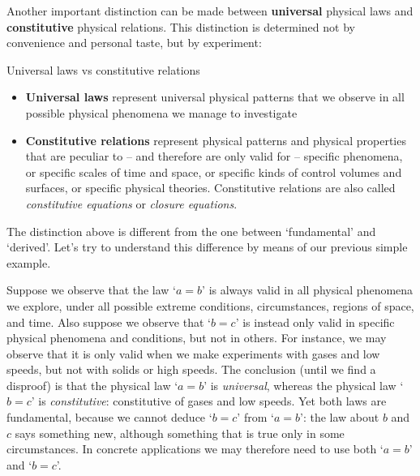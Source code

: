 \documentclass[a4paper,12pt,%
onecolumn,oneside,%
british%
]{memoir}
\renewcommand*{\|}[1][]{\nonscript\:#1\vert\nonscript\:\mathopen{}}
\begin{document}
Another important distinction can be made between \textbf{universal} physical laws and \textbf{constitutive} physical relations. This distinction is determined not by convenience and personal taste, but by experiment:
\begin{definition}{Universal laws vs constitutive relations}
  \begin{itemize}
  \item\textbf{Universal laws} represent universal physical patterns that we observe in all possible physical phenomena we manage to investigate

  \item\textbf{Constitutive relations} represent physical patterns and physical properties that are peculiar to -- and therefore are only valid for -- specific phenomena, or specific scales of time and space, or specific kinds of control volumes and surfaces, or specific physical theories. Constitutive relations are also called \emph{constitutive equations} or \emph{closure equations}.
  \end{itemize}
\end{definition}
%
%

The distinction above is different from the one between \enquote*{fundamental} and \enquote*{derived}. Let's try to understand this difference by means of our previous simple example.

Suppose we observe that the law \enquote*{$a=b$} is always valid in all physical phenomena we explore, under all possible extreme conditions, circumstances, regions of space, and time. Also suppose we observe that \enquote*{$b=c$} is instead only valid in specific physical phenomena and conditions, but not in others. For instance, we may observe that it is only valid when we make experiments with gases and low speeds, but not with solids or high speeds. The conclusion (until we find a disproof) is that the physical law \enquote*{$a=b$} is \emph{universal}, whereas the physical law \enquote*{$b=c$} is \emph{constitutive}: constitutive of gases and low speeds. Yet both laws are fundamental, because we cannot deduce \enquote*{$b=c$} from \enquote*{$a=b$}: the law about $b$ and $c$ says something new, although something that is true only in some circumstances. In concrete applications we may therefore need to use both \enquote*{$a=b$} and \enquote*{$b=c$}.
\end{document}
